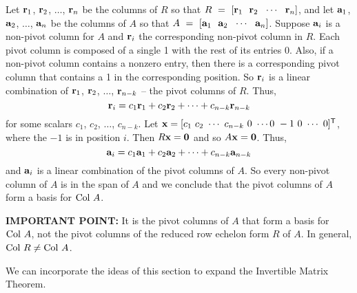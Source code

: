 \begin{description}
Let $\mathbf{r}_1$, $\mathbf{r}_2$, $\ldots$, $\mathbf{r}_n$ be the columns of $R$ so that $R~=~[\vr_1 \ \ \vr_2 \ \ \cdots \ \ \vr_n]$, and let $\mathbf{a}_1$, $\mathbf{a}_2$, $\ldots$, $\mathbf{a}_n$ be the columns of $A$ so that $A~=~[\va_1 \ \ \va_2 \ \ \cdots \ \ \va_n]$. Suppose $\mathbf{a}_i$ is a non-pivot column for $A$ and $\mathbf{r}_i$ the corresponding non-pivot column in $R$. Each pivot column is composed of a single 1 with the rest of its entries 0. Also, if a non-pivot column contains a nonzero entry, then there is a corresponding pivot column that contains a 1 in the corresponding position. So $\mathbf{r}_i$ is a linear combination of $\mathbf{r}_1$, $\mathbf{r}_2$, $\ldots$, $\mathbf{r}_{n-k}$ -- the pivot columns of $R$. Thus,
\[\mathbf{r}_i = c_1 \mathbf{r}_1 + c_2\mathbf{r}_2 + \cdots + c_{n-k}\mathbf{r}_{n-k}\]
for some scalars $c_1$, $c_2$, $\ldots$, $c_{n-k}$. Let $\vx = [c_1 \ c_2 \ \cdots \ c_{n-k} \ 0 \ \cdots 0 \ -1 \ 0 \ \cdots \ 0]^{\tr}$, where the $-1$ is in position $i$. Then $R \mathbf{x} = \mathbf{0}$ and so $A \mathbf{x} = \mathbf{0}$. Thus, 
\[\mathbf{a}_i = c_1 \mathbf{a}_1 + c_2\mathbf{a}_2 + \cdots + c_{n-k}\mathbf{a}_{n-k}\]
and $\mathbf{a}_i$ is a linear combination of the pivot columns of $A$. So every non-pivot column of $A$ is in the span of $A$ and we conclude that the pivot columns of $A$ form a basis for $\text{Col } A$. 
\end{description}

\noindent \textbf{IMPORTANT POINT:} It is the pivot columns of $A$ that form a basis for $\text{Col } A$, not the pivot columns of the reduced row echelon form $R$ of $A$. In general, $\text{Col } R \neq \text{Col } A$. 

We can incorporate the ideas of this section to expand the Invertible Matrix Theorem.



